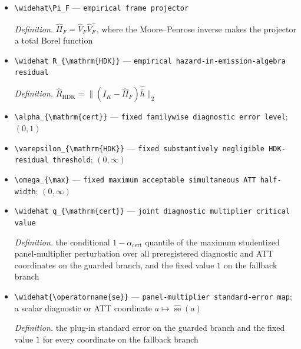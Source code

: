 \documentclass{article}
\begin{document}
\begin{itemize}
  \item \texttt{\textbackslash{}\allowbreak{}widehat\textbackslash{}\allowbreak{}Pi\_\allowbreak{}F} --- \texttt{empirical frame projector}
  \par\smallskip\noindent\emph{Definition.} \(\widehat\Pi_F=\widehat V_F\widehat V_F^{+}\), where the Moore--Penrose inverse makes the projector a total Borel function
  \item \texttt{\textbackslash{}\allowbreak{}widehat R\_\allowbreak{}\{\textbackslash{}\allowbreak{}mathrm\{HDK\}\allowbreak{}\}\allowbreak{}} --- \texttt{empirical hazard-\allowbreak{}in-\allowbreak{}emission-\allowbreak{}algebra residual}
  \par\smallskip\noindent\emph{Definition.} \(\widehat R_{\mathrm{HDK}}=\|(I_K-\widehat\Pi_F)\widehat{\bar h}\|_2\)
  \item \texttt{\textbackslash{}\allowbreak{}alpha\_\allowbreak{}\{\textbackslash{}\allowbreak{}mathrm\{cert\}\allowbreak{}\}\allowbreak{}} --- \texttt{fixed familywise diagnostic error level}; \((0,1)\)
  \item \texttt{\textbackslash{}\allowbreak{}varepsilon\_\allowbreak{}\{\textbackslash{}\allowbreak{}mathrm\{HDK\}\allowbreak{}\}\allowbreak{}} --- \texttt{fixed substantively negligible HDK-\allowbreak{}residual threshold}; \((0,\infty)\)
  \item \texttt{\textbackslash{}\allowbreak{}omega\_\allowbreak{}\{\textbackslash{}\allowbreak{}max\}\allowbreak{}} --- \texttt{fixed maximum acceptable simultaneous ATT half-\allowbreak{}width}; \((0,\infty)\)
  \item \texttt{\textbackslash{}\allowbreak{}widehat q\_\allowbreak{}\{\textbackslash{}\allowbreak{}mathrm\{cert\}\allowbreak{}\}\allowbreak{}} --- \texttt{joint diagnostic multiplier critical value}
  \par\smallskip\noindent\emph{Definition.} the conditional \(1-\alpha_{\mathrm{cert}}\) quantile of the maximum studentized panel-multiplier perturbation over all preregistered diagnostic and ATT coordinates on the guarded branch, and the fixed value \(1\) on the fallback branch
  \item \texttt{\textbackslash{}\allowbreak{}widehat\{\textbackslash{}\allowbreak{}operatorname\{se\}\allowbreak{}\}\allowbreak{}} --- \texttt{panel-\allowbreak{}multiplier standard-\allowbreak{}error map}; a scalar diagnostic or ATT coordinate \(a\mapsto\widehat{\operatorname{se}}(a)\)
  \par\smallskip\noindent\emph{Definition.} the plug-in standard error on the guarded branch and the fixed value \(1\) for every coordinate on the fallback branch

\end{itemize}
\end{document}
